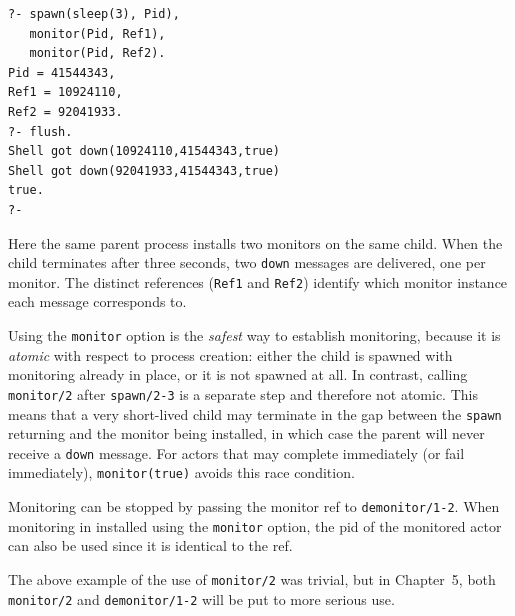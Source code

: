 \begin{verbatim}
?- spawn(sleep(3), Pid),
   monitor(Pid, Ref1),
   monitor(Pid, Ref2).
Pid = 41544343,
Ref1 = 10924110,
Ref2 = 92041933.
?- flush.
Shell got down(10924110,41544343,true)
Shell got down(92041933,41544343,true)
true.
?-
\end{verbatim}

\noindent Here the same parent process installs two monitors on the same child. When the child terminates after three seconds, two \texttt{down} messages are delivered, one per monitor. The distinct references (\texttt{Ref1} and \texttt{Ref2}) identify which monitor instance each message corresponds to.

Using the \texttt{monitor} option is the \emph{safest} way to establish monitoring, because it is \emph{atomic} with respect to process creation: either the child is spawned with monitoring already in place, or it is not spawned at all. In contrast, calling \texttt{monitor/2} after \texttt{spawn/2-3} is a separate step and therefore not atomic. This means that a very short-lived child may terminate in the gap between the \texttt{spawn} returning and the monitor being installed, in which case the parent will never receive a \texttt{down} message. For actors that may complete immediately (or fail immediately), \texttt{monitor(true)} avoids this race condition.

Monitoring can be stopped by passing the monitor ref to \texttt{demonitor/1-2}. When monitoring in installed using the \texttt{monitor} option, the pid of the monitored actor can also be used since it is identical to the ref.

\medskip

\noindent The above example of the use of \texttt{monitor/2} was trivial, but in Chapter~5, both \texttt{monitor/2} and \texttt{demonitor/1-2} will be put to more serious use.




